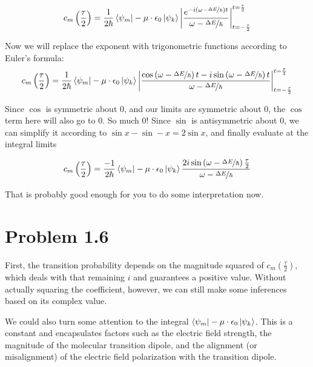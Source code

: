 \documentclass[12pt, openany, letterpaper]{memoir}
\begin{document}
$$
c_m\left(\frac{\tau}{2}\right) = \frac{1}{2\hbar}\left< \psi_m \right|-\mathbf{\mu}\cdot\epsilon_0 \left| \psi_k \right> \left| \frac{e^{-i\left(\omega-\nicefrac{\Delta E}{\hbar}\right)t}}{\omega - \nicefrac{\Delta E}{\hbar}}\right|_{t=-\frac{\tau}{2}}^{t=\frac{\tau}{2}}
$$

Now we will replace the exponent with trigonometric functions according to Euler's formula:
$$
c_m\left(\frac{\tau}{2}\right) = \frac{1}{2\hbar}\left< \psi_m \right|-\mathbf{\mu}\cdot\epsilon_0 \left| \psi_k \right> \left| \frac{\cos\left(\omega-\nicefrac{\Delta E}{\hbar}\right)t - i\sin\left(\omega-\nicefrac{\Delta E}{\hbar}\right)t}{\omega - \nicefrac{\Delta E}{\hbar}}\right|_{t=-\frac{\tau}{2}}^{t=\frac{\tau}{2}}
$$

Since $\cos$ is symmetric about $0$, and our limits are symmetric about $0$, the $\cos$ term here will also go to $0$. So much $0$! Since $\sin$ is antisymmetric about $0$, we can simplify it according to $\sin x - \sin -x = 2\sin x$, and finally evaluate at the integral limits

$$
c_m\left(\frac{\tau}{2}\right) = \frac{-1}{2\hbar}\left< \psi_m \right|-\mathbf{\mu}\cdot\epsilon_0 \left| \psi_k \right> \frac{2i\sin\left(\omega-\nicefrac{\Delta E}{\hbar}\right)\frac{\tau}{2}}{\omega - \nicefrac{\Delta E}{\hbar}}
$$

That is probably good enough for you to do some interpretation now.

\section*{Problem 1.6}

First, the transition probability depends on the magnitude squared of $c_m\left(\frac{\tau}{2}\right)$, which deals with that remaining $i$ and guarantees a positive value. Without actually squaring the coefficient, however, we can still make some inferences based on its complex value.

We could also turn some attention to the integral $\left< \psi_m \right|-\mathbf{\mu}\cdot\epsilon_0 \left| \psi_k \right>$. This is a constant and encapsulates factors such as the electric field strength, the magnitude of the molecular transition dipole, and the alignment (or misalignment) of the electric field polarization with the transition dipole.
\end{document}
